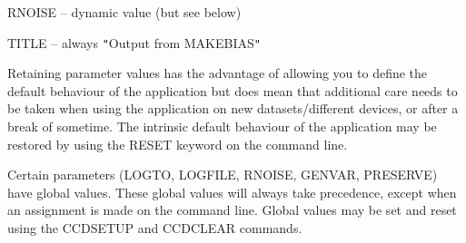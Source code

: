 {{{         \sstitem
            RNOISE  -- dynamic value (but see below)

         \sstitem
            TITLE   -- always {\tt "}Output from MAKEBIAS{\tt "}

      }
      Retaining parameter values has the advantage of allowing you to
      define the default behaviour of the application but does mean
      that additional care needs to be taken when using the application
      on new datasets/different devices, or after a break of sometime.
      The intrinsic default behaviour of the application may be
      restored by using the RESET keyword on the command line.

      Certain parameters (LOGTO, LOGFILE, RNOISE, GENVAR, PRESERVE)
      have global values. These global values will always take
      precedence, except when an assignment is made on the command line.
      Global values may be set and reset using the CCDSETUP and
      CCDCLEAR commands.
   }
}

